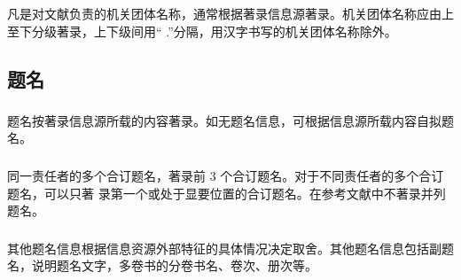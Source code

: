 \documentclass{article}
\begin{document}
\begin{refsection}
\nocite{帛画2023,anon1981-628}

{\printbibliography[heading=none,env=indentegenv]}
\end{refsection}

\subsubsection{} 凡是对文献负责的机关团体名称，通常根据著录信息源著录。机关团体名称应由上至下分级著录，上下级间用“ .”分隔，用汉字书写的机关团体名称除外。

\begin{refsection}
\nocite{中国科学院物理研究所--}
\nocite{贵州省土穰普查办公室--}
\nocite{AmericanChemicalSociety--}
\nocite{StanfordUniversity--}

{}
\end{refsection}

\subsection{题名}

\subsubsection{} 题名按著录信息源所载的内容著录。如无题名信息，可根据信息源所载内容自拟题名。
\begin{refsection}
\nocite{西游记词汇--}
\nocite{张子正蒙注--}
\nocite{化学动力学和反应器原理--}
\nocite{袖珍神学--}
\nocite{北京师范大学学报--}
\nocite{Gasesinsea--}
\nocite{jmath--}


{}
\end{refsection}

\subsubsection{} 同一责任者的多个合订题名，著录前 3 个合订题名。对于不同责任者的多个合订题名，可以只著
录第一个或处于显要位置的合订题名。在参考文献中不著录并列题名。

\begin{refsection}
\nocite{为人民服务--}
\nocite{大趋势--}

{}
\end{refsection}

\subsubsection{} 其他题名信息根据信息资源外部特征的具体情况决定取舍。其他题名信息包括副题名，说明题名文字，多卷书的分卷书名、卷次、册次等。
\end{document}
